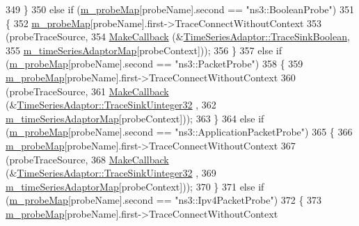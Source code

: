 \begin{DoxyCode}
349     \}
350   \textcolor{keywordflow}{else} \textcolor{keywordflow}{if} (\hyperlink{classns3_1_1GnuplotHelper_aa4e50b82ac09e3ec99c1881f37f12ca5}{m\_probeMap}[probeName].second == \textcolor{stringliteral}{"ns3::BooleanProbe"})
351     \{
352       \hyperlink{classns3_1_1GnuplotHelper_aa4e50b82ac09e3ec99c1881f37f12ca5}{m\_probeMap}[probeName].first->TraceConnectWithoutContext
353         (probeTraceSource,
354         \hyperlink{group__makecallbackmemptr_ga9376283685aa99d204048d6a4b7610a4}{MakeCallback} (&\hyperlink{classns3_1_1TimeSeriesAdaptor_a85bb6303947154ffeefb4ab5c96c7bc3}{TimeSeriesAdaptor::TraceSinkBoolean},
355                       \hyperlink{classns3_1_1GnuplotHelper_ad013691ac007d20ac6c04261dda2432a}{m\_timeSeriesAdaptorMap}[probeContext]));
356     \}
357   \textcolor{keywordflow}{else} \textcolor{keywordflow}{if} (\hyperlink{classns3_1_1GnuplotHelper_aa4e50b82ac09e3ec99c1881f37f12ca5}{m\_probeMap}[probeName].second == \textcolor{stringliteral}{"ns3::PacketProbe"})
358     \{
359       \hyperlink{classns3_1_1GnuplotHelper_aa4e50b82ac09e3ec99c1881f37f12ca5}{m\_probeMap}[probeName].first->TraceConnectWithoutContext
360         (probeTraceSource,
361         \hyperlink{group__makecallbackmemptr_ga9376283685aa99d204048d6a4b7610a4}{MakeCallback} (&\hyperlink{classns3_1_1TimeSeriesAdaptor_add04eee090a86dc859b2415710c85b30}{TimeSeriesAdaptor::TraceSinkUinteger32}
      ,
362                       \hyperlink{classns3_1_1GnuplotHelper_ad013691ac007d20ac6c04261dda2432a}{m\_timeSeriesAdaptorMap}[probeContext]));
363     \}
364   \textcolor{keywordflow}{else} \textcolor{keywordflow}{if} (\hyperlink{classns3_1_1GnuplotHelper_aa4e50b82ac09e3ec99c1881f37f12ca5}{m\_probeMap}[probeName].second == \textcolor{stringliteral}{"ns3::ApplicationPacketProbe"})
365     \{
366       \hyperlink{classns3_1_1GnuplotHelper_aa4e50b82ac09e3ec99c1881f37f12ca5}{m\_probeMap}[probeName].first->TraceConnectWithoutContext
367         (probeTraceSource,
368         \hyperlink{group__makecallbackmemptr_ga9376283685aa99d204048d6a4b7610a4}{MakeCallback} (&\hyperlink{classns3_1_1TimeSeriesAdaptor_add04eee090a86dc859b2415710c85b30}{TimeSeriesAdaptor::TraceSinkUinteger32}
      ,
369                       \hyperlink{classns3_1_1GnuplotHelper_ad013691ac007d20ac6c04261dda2432a}{m\_timeSeriesAdaptorMap}[probeContext]));
370     \}
371   \textcolor{keywordflow}{else} \textcolor{keywordflow}{if} (\hyperlink{classns3_1_1GnuplotHelper_aa4e50b82ac09e3ec99c1881f37f12ca5}{m\_probeMap}[probeName].second == \textcolor{stringliteral}{"ns3::Ipv4PacketProbe"})
372     \{
373       \hyperlink{classns3_1_1GnuplotHelper_aa4e50b82ac09e3ec99c1881f37f12ca5}{m\_probeMap}[probeName].first->TraceConnectWithoutContext

\end{DoxyCode}

